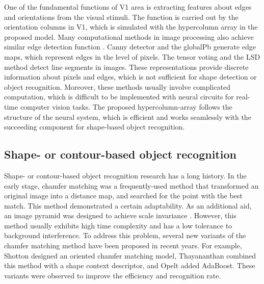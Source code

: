 \documentclass{article}
\begin{document}
One of the fundamental functions of V1 area is extracting features about edges and orientations from the visual stimuli.
The function is carried out by the orientation columns in V1, 
which is simulated with the hypercolumn array in the proposed model. 
Many computational methods in image processing also achieve similar edge detection function
\cite{canny1986,arbelaez2011,moreno2014}.
Canny detector \cite{canny1986} and the globalPb \cite{arbelaez2011} generate edge maps,
which represent edges in the level of pixels. 
The tensor voting \cite{moreno2014} and the LSD method \cite{von2008} detect line segments in images. 
These representations provide discrete information about pixels and edges, 
which is not sufficient for shape detection or object recognition. 
Moreover, these methods usually involve complicated computation, 
which is difficult to be implemented with neural circuits for real-time computer vision tasks. 
The proposed hypercolumn-array follows the structure of the neural system, 
which is efficient and works seamlessly with the succeeding component for shape-based object recognition.

\subsection{Shape- or contour-based object recognition}

Shape- or contour-based object recognition research has a long history. 
In the early stage, chamfer matching \cite{borgefors1988,shotton2005,thayananthan2003,opelt2006} 
was a frequently-used method that transformed an original image into a distance map, 
and searched for the point with the best match. 
This method demonstrated a certain adaptability. 
As an additional aid, an image pyramid was designed to achieve scale invariance \cite{borgefors1988}. 
However, this method usually exhibits high time complexity and has a low tolerance to background interference. 
To address this problem, several new variants of the chamfer matching method have been proposed in recent years. 
For example, Shotton \cite{shotton2005} designed an oriented chamfer matching model, 
Thayananthan \cite{thayananthan2003} combined this method with a shape context descriptor, 
and Opelt \cite{thayananthan2003} added AdaBoost. 
These variants were observed to improve the efficiency and recognition rate.
\end{document}
